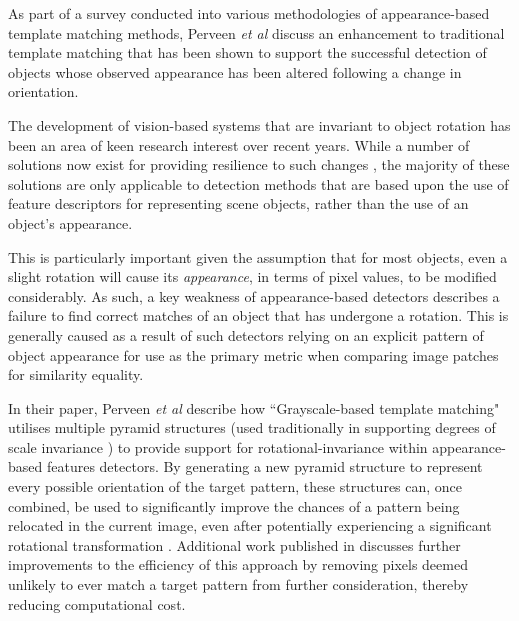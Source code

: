 As part of a survey conducted into various methodologies of appearance-based template matching methods, Perveen \textit{et al} \cite{perveen} discuss an enhancement to traditional template matching that has been shown to support the successful detection of objects whose observed appearance has been altered following a change in orientation. 

  The development of vision-based systems that are invariant to object rotation has been an area of keen research interest over recent years. While a number of solutions now exist for providing resilience to such changes \cite{sift}, the majority of these solutions are only applicable to detection methods that are based upon the use of feature descriptors for representing scene objects, rather than the use of an object's appearance. 
  
  This is particularly important given the assumption that for most objects, even a slight rotation will cause its \textit{appearance}, in terms of pixel values, to be modified considerably. As such, a key weakness of appearance-based detectors describes a failure to find correct matches of an object that has undergone a rotation. This is generally caused as a result of such detectors relying on an explicit pattern of object appearance for use as the primary metric when comparing image patches for similarity equality.
 
 In their paper, Perveen \textit{et al} describe how ``Grayscale-based template matching" utilises multiple pyramid structures (used traditionally in supporting degrees of scale invariance \cite{lowe}) to provide support for rotational-invariance within appearance-based features detectors. By generating a new pyramid structure to represent every possible orientation of the target pattern, these structures can, once combined, be used to significantly improve the chances of a pattern being relocated in the current image, even after potentially experiencing a significant rotational transformation \cite{perveen}. Additional work published in \cite{kim} discusses further improvements to the efficiency of this approach by removing pixels deemed unlikely to ever match a target pattern from further consideration, thereby reducing computational cost. 

